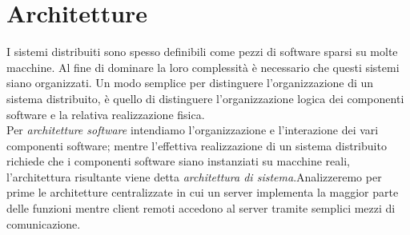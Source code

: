 \section{Architetture}\label{capitolo2}
I sistemi distribuiti sono spesso definibili come pezzi di software sparsi su molte macchine. Al fine di dominare la loro complessità è necessario che questi sistemi siano organizzati. Un modo semplice per distinguere l'organizzazione di un sistema distribuito, è quello di distinguere l'organizzazione logica dei componenti software e la relativa realizzazione fisica.\\
Per \emph{architetture software} intendiamo l'organizzazione e l'interazione dei vari componenti software; mentre l'effettiva realizzazione di un sistema distribuito richiede che i componenti software siano instanziati su macchine reali, l'architettura risultante viene detta \emph{architettura di sistema}.Analizzeremo per prime le architetture centralizzate in cui un server implementa la maggior parte delle funzioni mentre client remoti accedono al server tramite semplici mezzi di comunicazione.\\
